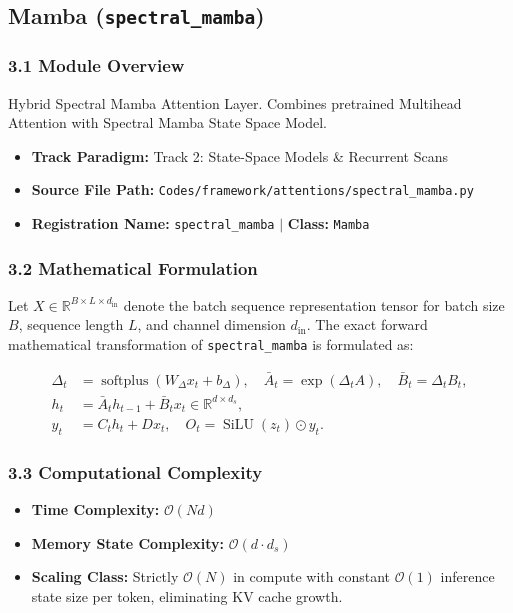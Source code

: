 \subsection{Mamba (\texttt{spectral\_mamba})}
\label{sec:app_module_spectral_mamba}

\subsubsection*{3.1 Module Overview}
Hybrid Spectral Mamba Attention Layer. Combines pretrained Multihead Attention with Spectral Mamba State Space Model.
\begin{itemize}
    \item \textbf{Track Paradigm:} Track 2: State-Space Models & Recurrent Scans
    \item \textbf{Source File Path:} \texttt{Codes/framework/attentions/spectral\_mamba.py}
    \item \textbf{Registration Name:} \texttt{spectral\_mamba} $\mid$ \textbf{Class:} \texttt{Mamba}
\end{itemize}

\subsubsection*{3.2 Mathematical Formulation}
Let $X \in \mathbb{R}^{B \times L \times d_{\text{in}}}$ denote the batch sequence representation tensor for batch size $B$, sequence length $L$, and channel dimension $d_{\text{in}}$. The exact forward mathematical transformation of \texttt{spectral\_mamba} is formulated as:

\begin{align}
\Delta_t &= \operatorname{softplus}(W_\Delta x_t + b_\Delta), \quad \bar{A}_t = \exp(\Delta_t A), \quad \bar{B}_t = \Delta_t B_t, \\
h_t &= \bar{A}_t h_{t-1} + \bar{B}_t x_t \in \mathbb{R}^{d \times d_s}, \\
y_t &= C_t h_t + D x_t, \quad O_t = \operatorname{SiLU}(z_t) \odot y_t.
\end{align}


\subsubsection*{3.3 Computational Complexity}
\begin{itemize}
    \item \textbf{Time Complexity:} $\mathcal{O}(N d)$
    \item \textbf{Memory State Complexity:} $\mathcal{O}(d \cdot d_s)$
    \item \textbf{Scaling Class:} Strictly $\mathcal{O}(N)$ in compute with constant $\mathcal{O}(1)$ inference state size per token, eliminating KV cache growth.
\end{itemize}

